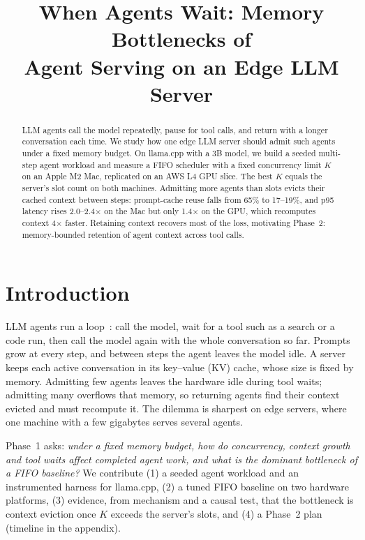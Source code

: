 \documentclass[conference,letterpaper]{IEEEtran}
\begin{document}
\title{When Agents Wait: Memory Bottlenecks of\\Agent Serving on an Edge LLM Server}

\author{
}

\maketitle
\thispagestyle{plain}\pagestyle{plain}

\begin{abstract}
LLM agents call the model repeatedly, pause for tool calls, and return with a longer conversation each time. We study how one edge LLM server should admit such agents under a fixed memory budget. On llama.cpp with a 3B model, we build a seeded multi-step agent workload and measure a FIFO scheduler with a fixed concurrency limit $K$ on an Apple M2 Mac, replicated on an AWS L4 GPU slice. The best $K$ equals the server's slot count on both machines. Admitting more agents than slots evicts their cached context between steps: prompt-cache reuse falls from 65\% to 17--19\%, and p95 latency rises 2.0--2.4$\times$ on the Mac but only 1.4$\times$ on the GPU, which recomputes context 4$\times$ faster. Retaining context recovers most of the loss, motivating Phase~2: memory-bounded retention of agent context across tool calls.
\end{abstract}

\section{Introduction}
LLM agents run a loop~\cite{yao2023react}: call the model, wait for a tool such as a search or a code run, then call the model again with the whole conversation so far. Prompts grow at every step, and between steps the agent leaves the model idle. A server keeps each active conversation in its key--value (KV) cache, whose size is fixed by memory. Admitting few agents leaves the hardware idle during tool waits; admitting many overflows that memory, so returning agents find their context evicted and must recompute it. The dilemma is sharpest on edge servers, where one machine with a few gigabytes serves several agents.

Phase~1 asks: \emph{under a fixed memory budget, how do concurrency, context growth and tool waits affect completed agent work, and what is the dominant bottleneck of a FIFO baseline?} We contribute (1) a seeded agent workload and an instrumented harness for llama.cpp, (2) a tuned FIFO baseline on two hardware platforms, (3) evidence, from mechanism and a causal test, that the bottleneck is context eviction once $K$ exceeds the server's slots, and (4) a Phase~2 plan (timeline in the appendix).
\end{document}
